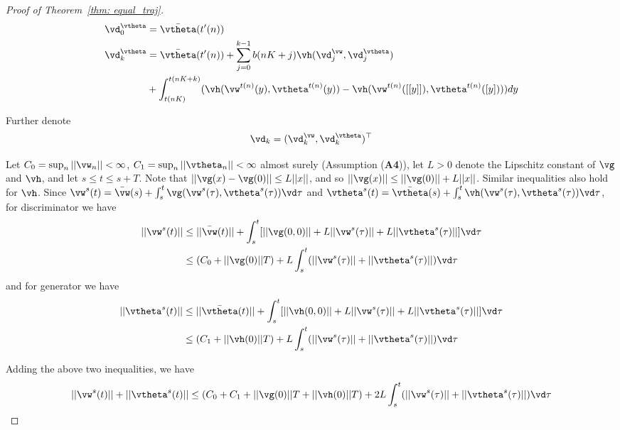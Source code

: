 \documentclass{article}
\def\thmref#1{Theorem~\ref{#1}}
\begin{document}
\begin{proof}[Proof of \thmref{thm: equal_traj}]
		\begin{equation}
		\begin{split}
		\vd^{\vtheta}_0 &= \bar{\vtheta}(t'(n))\\
		\vd^{\vtheta}_k &=\bar{\vtheta}(t'(n))+\sum_{j=0}^{k-1} b(nK+j)\vh(\vd^{\vw}_{j}, \vd^{\vtheta}_{j})\\
		&+\int_{t(nK)}^{t(nK+k)}(\vh( \vw^{t(n)}(y),\vtheta^{t(n)}(y))-\vh( \vw^{t(n)}([[y]]),  \vtheta^{t(n)}([y])))dy
		\end{split}
		\label{eq: recons_seq2t}
		\end{equation}
		
		Further denote
		\begin{equation}
		\vd_k=(\vd^{\vw}_k, \vd^{\vtheta}_k)^\top
		\label{eq: recons_seq2}
		\end{equation}
		
		Let $C_0=\sup_n||\vw_n||<\infty$, $C_1=\sup_n||\vtheta_n||<\infty$ almost surely (Assumption (\textbf{A4})), let $L>0$ denote the Lipschitz constant of $\vg$ and $\vh$, and let $s\leq t\leq s+T$. Note that $||\vg(x)-\vg(0)||\leq L||x||$, and so $||\vg(x)||\leq ||\vg(0)||+L||x||$. Similar inequalities also hold for $\vh$. Since $\vw^s(t)=\bar{\vw}(s)+\int_s^t \vg(\vw^s(\tau), \vtheta^s(\tau))\vd\tau$ and $\vtheta^s(t)=\bar{\vtheta}(s)+\int_s^t \vh(\vw^s(\tau), \vtheta^s(\tau))\vd\tau$, for discriminator we have
		\begin{equation}
		\begin{split}
		||\vw^s(t)||&\leq ||\bar{\vw}(t)||+\int_s^t [||\vg(0,0)||+L||\vw^s(\tau)||+L||\vtheta^s(\tau)||]\vd\tau\\
		&\leq (C_0+||\vg(0)||T)+L\int_s^t(||\vw^s(\tau)||+||\vtheta^s(\tau)||)\vd\tau
		\end{split}
		\end{equation}
and for generator we have	\begin{equation}
		\begin{split}
		||\vtheta^s(t)||&\leq ||\bar{\vtheta}(t)||+\int_s^t [||\vh(0,0)||+L||\vw^s(\tau)||+L||\vtheta^s(\tau)||]\vd\tau\\
		&\leq (C_1+||\vh(0)||T)+L\int_s^t(||\vw^s(\tau)||+||\vtheta^s(\tau)||)\vd\tau
		\end{split}
		\end{equation}
		
		Adding the above two inequalities, we have
		\begin{equation}
		||\vw^s(t)||+||\vtheta^s(t)||\leq (C_0+C_1+||\vg(0)||T+||\vh(0)||T)+2L\int_s^t(||\vw^s(\tau)||+||\vtheta^s(\tau)||)\vd\tau
		\end{equation}
		

\end{proof}
\end{document}
